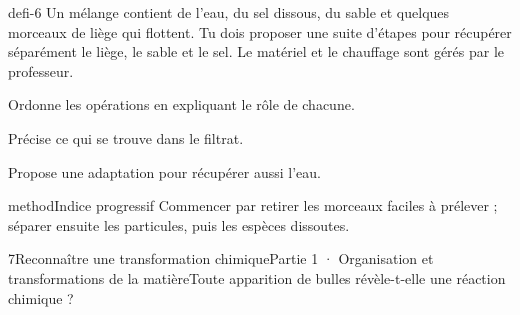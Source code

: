 \documentclass[12pt,twoside,openany]{book}
\begin{document}
\label{defi-ex-6}
\begin{pcFiche}{defi-6}
Un mélange contient de l’eau, du sel dissous, du sable et quelques morceaux de liège qui flottent. Tu dois proposer une suite d’étapes pour récupérer séparément le liège, le sable et le sel. Le matériel et le chauffage sont gérés par le professeur.\par
{}
\begin{questions}
\item Ordonne les opérations en expliquant le rôle de chacune.
\item Précise ce qui se trouve dans le filtrat.
\item Propose une adaptation pour récupérer aussi l’eau.
\end{questions}
\begin{pcEncadre}{method}{Indice progressif}
Commencer par retirer les morceaux faciles à prélever ; séparer ensuite les particules, puis les espèces dissoutes.\par
\end{pcEncadre}
\end{pcFiche}
\clearpage\pagestyle{otMain}
\begin{ouverture}[college1]{7}{Reconnaître une transformation chimique}{Partie 1 · Organisation et transformations de la matière}{Toute apparition de bulles révèle-t-elle une réaction chimique ?}
\end{ouverture}
\label{ch-7-cours-1}
\label{ess-7}
\end{document}
